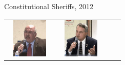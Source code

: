 \begin{frame}{Constitutional Sheriffs, 2012}
\begin{table}[h]
\begin{tabular}{cccc}
    \includegraphics[width=0.75\textwidth,height=.24\textheight,keepaspectratio=true]{img/s3.png} &
    \includegraphics[width=0.75\textwidth,height=.24\textheight,keepaspectratio=true]{img/s4.png} \\

\end{tabular}
\end{table}
\end{frame}
